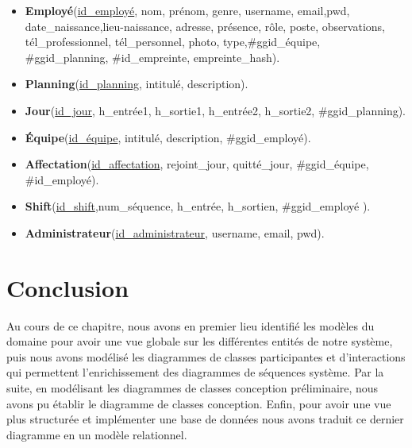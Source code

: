 \begin{itemize}
    \item [\textbullet]\textbf{Employé}(\underline{id\_employé}, nom, prénom, genre, 
        username, email,pwd, date\_naissance,lieu-naissance, adresse, présence, rôle, poste, 
        observations, tél\_professionnel, tél\_personnel, photo, type,\#ggid\_équipe, 
        \#ggid\_planning, \#id\_empreinte, empreinte\_hash).

	\item [\textbullet]\textbf{Planning}(\underline{id\_planning}, intitulé, 
        description).
    
    \item [\textbullet]\textbf{Jour}(\underline{id\_jour}, h\_entrée1, h\_sortie1, 
        h\_entrée2, h\_sortie2, \#ggid\_planning).
    
    \item [\textbullet]\textbf{Équipe}(\underline{id\_équipe}, intitulé, 
        description, \#ggid\_employé).
    
    \item [\textbullet]\textbf{Affectation}(\underline{id\_affectation}, 
        rejoint\_jour, quitté\_jour, \#ggid\_équipe, \#id\_employé).
    
    \item [\textbullet]\textbf{Shift}(\underline{id\_shift},num\_séquence, 
        h\_entrée, h\_sortien, \#ggid\_employé ).
    
    \item [\textbullet]\textbf{Administrateur}(\underline{id\_administrateur}, 
        username, email, pwd).
\end{itemize}

\section{Conclusion}
Au cours de ce chapitre, nous avons en premier lieu identifié les modèles du
domaine pour avoir une vue globale sur les différentes entités de notre système,
puis nous avons modélisé les diagrammes de classes participantes et
d’interactions qui permettent l’enrichissement des diagrammes de séquences
système. Par la suite, en modélisant les diagrammes de classes conception
préliminaire, nous avons pu établir le diagramme de classes conception.  Enfin,
pour avoir une vue plus structurée et implémenter une base de données nous avons
traduit ce dernier diagramme en un modèle relationnel. 
